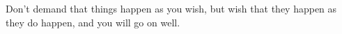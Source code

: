Don't demand that things happen as you wish, but wish that they
happen as they do happen, and you will go on well. 
